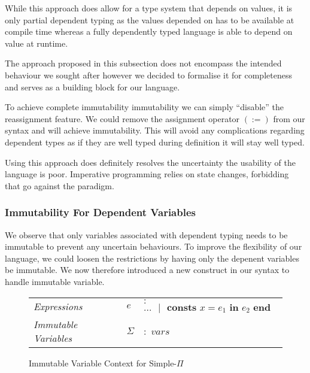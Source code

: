 \documentclass[a4paper,12pt]{report}
\begin{document}
\par
While this approach does allow for a type system that depends on values, it is 
only partial dependent typing as the values depended on has to be available at 
compile time whereas a fully dependently typed language is able to depend on 
value at runtime.

\par
The approach proposed in this subsection does not encompass the intended behaviour we 
sought after however we decided to formalise it for completeness and serves as 
a building block for our language. 

\par
To achieve complete immutability immutability we can simply ``disable'' the 
reassignment feature. We could remove the assignment operator $(:=)$ from our 
syntax and will achieve immutability. This will avoid any complications 
regarding dependent types as 
if they are well typed during definition it will stay well typed. 

\par
Using this approach does definitely resolves the uncertainty the usability of 
the language is poor. Imperative programming relies on state changes, forbidding 
that go against the paradigm. 

\subsubsection{Immutability For Dependent Variables}
We observe that only variables associated with dependent typing needs to be 
immutable to prevent any uncertain behaviours. To improve the flexibility of our 
language, we could loosen the restrictions by having only the depenent variables 
be immutable. We now therefore introduced a new construct in our syntax to handle immutable 
variable. 

\begin{figure}[H]
  \begin{center}
    \begin{tabular} {l l l}
      \textit{Expressions} & $e$& $:$ $...\text{ }|\text{ }
        \textbf{consts }x = e_1 \textbf{ in }e_2\textbf{ end}$ \\
      \textit{Immutable Variables} & $\Sigma$ & $:$ $vars$ \\
    \end{tabular}
  \end{center}
  \caption{Immutable Variable Context for Simple-$\Pi$}
\end{figure}
\end{document}

